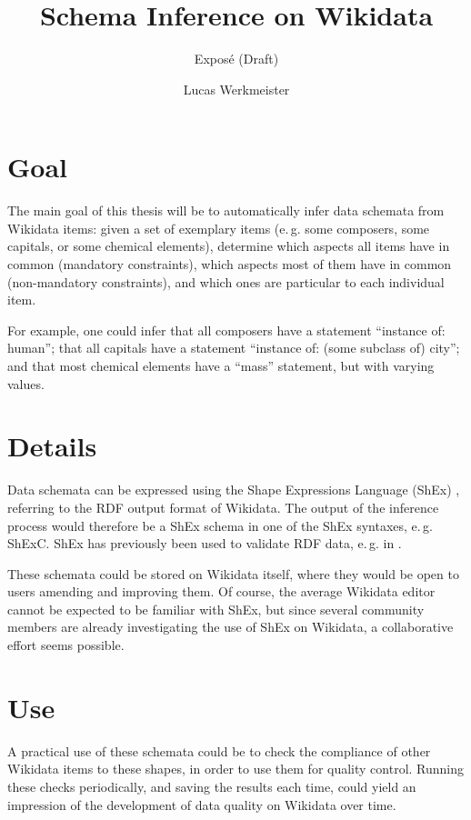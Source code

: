 \documentclass{scrartcl}
\title{Schema Inference on Wikidata}
\subtitle{Exposé (Draft)}
\author{Lucas Werkmeister}
\begin{document}
\maketitle

\section{Goal}

The main goal of this thesis will be to automatically infer data schemata from Wikidata items:
given a set of exemplary items (e.\,g. some composers, some capitals, or some chemical elements),
determine which aspects all items have in common (mandatory constraints),
which aspects most of them have in common (non-mandatory constraints),
and which ones are particular to each individual item.

For example, one could infer that all composers have a statement “instance of: human”;
that all capitals have a statement “instance of: (some subclass of) city”;
and that most chemical elements have a “mass” statement, but with varying values.

\section{Details}

Data schemata can be expressed using the Shape Expressions Language (ShEx) \cite{Prud'hommeaux:2014:SER:2660517.2660523},
referring to the RDF output format of Wikidata.
The output of the inference process would therefore be a ShEx schema in one of the ShEx syntaxes, e.\,g. ShExC.
ShEx has previously been used to validate RDF data, e.\,g. in \cite{SOLBRIG201790}.

These schemata could be stored on Wikidata itself,
where they would be open to users amending and improving them.
Of course, the average Wikidata editor cannot be expected to be familiar with ShEx,
but since several community members are already investigating the use of ShEx on Wikidata,
a collaborative effort seems possible.

\section{Use}

A practical use of these schemata could be to check the compliance of other Wikidata items to these shapes,
in order to use them for quality control.
Running these checks periodically, and saving the results each time,
could yield an impression of the development of data quality on Wikidata over time.
\end{document}
